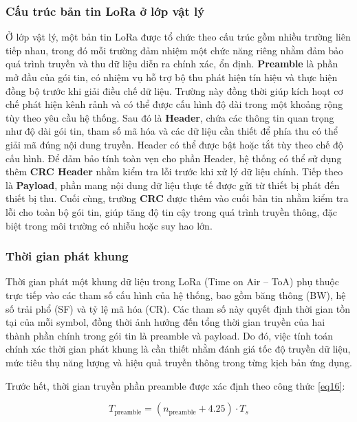 \documentclass{article}
\begin{document}
	\subsubsection{Cấu trúc bản tin LoRa ở lớp vật lý}
	
	Ở lớp vật lý, một bản tin LoRa được tổ chức theo cấu trúc gồm nhiều trường liên tiếp nhau, trong đó mỗi trường đảm nhiệm một chức năng riêng nhằm đảm bảo quá trình truyền và thu dữ liệu diễn ra chính xác, ổn định. \textbf{Preamble} là phần mở đầu của gói tin, có nhiệm vụ hỗ trợ bộ thu phát hiện tín hiệu và thực hiện đồng bộ trước khi giải điều chế dữ liệu. Trường này đồng thời giúp kích hoạt cơ chế phát hiện kênh rảnh và có thể được cấu hình độ dài trong một khoảng rộng tùy theo yêu cầu hệ thống. Sau đó là \textbf{Header}, chứa các thông tin quan trọng như độ dài gói tin, tham số mã hóa và các dữ liệu cần thiết để phía thu có thể giải mã đúng nội dung truyền. Header có thể được bật hoặc tắt tùy theo chế độ cấu hình. Để đảm bảo tính toàn vẹn cho phần Header, hệ thống có thể sử dụng thêm \textbf{CRC Header} nhằm kiểm tra lỗi trước khi xử lý dữ liệu chính. Tiếp theo là \textbf{Payload}, phần mang nội dung dữ liệu thực tế được gửi từ thiết bị phát đến thiết bị thu. Cuối cùng, trường \textbf{CRC} được thêm vào cuối bản tin nhằm kiểm tra lỗi cho toàn bộ gói tin, giúp tăng độ tin cậy trong quá trình truyền thông, đặc biệt trong môi trường có nhiễu hoặc suy hao lớn.
	
	\subsubsection{Thời gian phát khung}
	
	Thời gian phát một khung dữ liệu trong LoRa (Time on Air – ToA) phụ thuộc trực tiếp vào các tham số cấu hình của hệ thống, bao gồm băng thông (BW), hệ số trải phổ (SF) và tỷ lệ mã hóa (CR). Các tham số này quyết định thời gian tồn tại của mỗi symbol, đồng thời ảnh hưởng đến tổng thời gian truyền của hai thành phần chính trong gói tin là preamble và payload. Do đó, việc tính toán chính xác thời gian phát khung là cần thiết nhằm đánh giá tốc độ truyền dữ liệu, mức tiêu thụ năng lượng và hiệu quả truyền thông trong từng kịch bản ứng dụng.
	
	Trước hết, thời gian truyền phần preamble được xác định theo công thức \ref{eq16}:
	
	\begin{equation}\label{eq16}
		T_{\text{preamble}} = \left(n_{\text{preamble}} + 4.25\right) \cdot T_s
	\end{equation}
	
\end{document}
